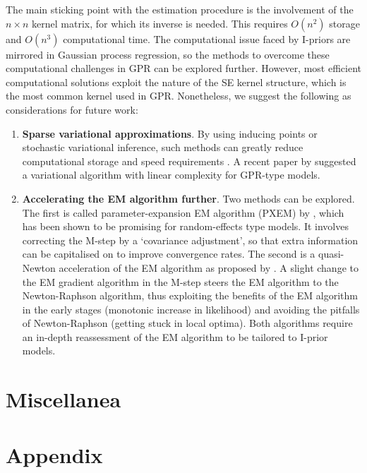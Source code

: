 \documentclass[a4paper,showframe,11pt]{report}
\begin{document}
The main sticking point with the estimation procedure is the involvement of the $n\times n$ kernel matrix, for which its inverse is needed.
This requires $O(n^2)$ storage and $O(n^3)$ computational time.
The computational issue faced by I-priors are mirrored in Gaussian process regression, so the methods to overcome these computational challenges in GPR can be explored further.
However, most efficient computational solutions exploit the nature of the SE kernel structure, which is the most common kernel used in GPR.
Nonetheless, we suggest the following as considerations for future work:
\begin{enumerate}
  \item \textbf{Sparse variational approximations}. By using inducing points or stochastic variational inference, such methods can greatly reduce computational storage and speed requirements . A recent paper by \citet{cheng2017variational} suggested a variational algorithm with linear complexity for GPR-type models.
  \item \textbf{Accelerating the EM algorithm further}. Two methods can be explored. The first is called parameter-expansion EM algorithm (PXEM) by \citep{liu1998parameter}, which has been shown to be promising for random-effects type models. It involves correcting the M-step by a `covariance adjustment', so that extra information can be capitalised on to improve convergence rates. The second is a quasi-Newton acceleration of the EM algorithm as proposed by \citet{lange1995quasi}. A slight change to the EM gradient algorithm in the M-step steers the EM algorithm to the Newton-Raphson algorithm, thus exploiting the benefits of the EM algorithm in the early stages (monotonic increase in likelihood) and avoiding the pitfalls of Newton-Raphson (getting stuck in local optima). Both algorithms require an in-depth reassessment of the EM algorithm to be tailored to I-prior models.
\end{enumerate}




\section{Miscellanea}


\ifstandalone
  \section*{Appendix}
  
  
  
  
\fi

\hClosingStuffStandalone
\end{document}

